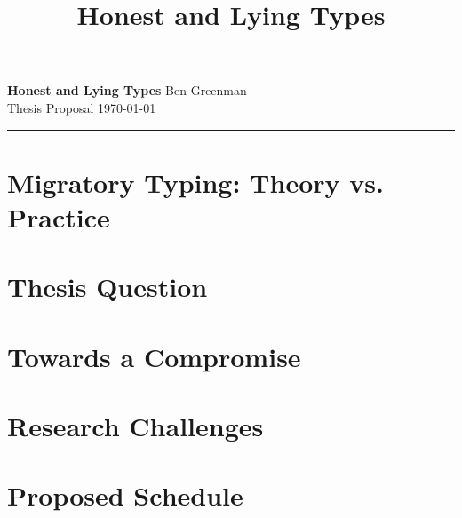 \documentclass[10pt]{article}
\title{Honest and Lying Types}
\renewcommand{\maketitle}{\noindent\textbf{Honest and Lying Types} \hfill Ben Greenman\\Thesis Proposal \hfill \today\\\hrule}
\begin{document}

\maketitle

\begin{abstract}

\end{abstract}

\newcommand{\mksec}[3]{\section{#3} \label{#1} }



\mksec{sec:history}{history}{Migratory Typing: Theory vs. Practice}
\mksec{sec:thesis}{thesis}{Thesis Question}
\mksec{sec:done}{done}{Towards a Compromise}
\mksec{sec:todo}{todo}{Research Challenges}
\mksec{sec:schedule}{schedule}{Proposed Schedule}

\footnotesize
%


\end{document}
